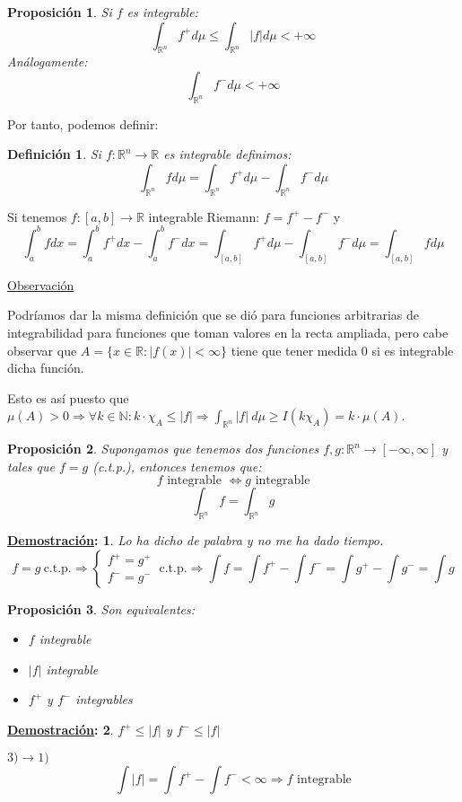 \documentclass[10pt,a4paper,openright]{book}
\theoremstyle{break}
\newtheorem*{defi}{Definición}
\newtheorem*{prop}{Proposición}
\newtheorem*{demo}{\underline{Demostración}:}
\begin{document}
\begin{prop}
Si $f$ es integrable: 
$$\int_{\mathbb{R}^n} f^+ d \mu \le \int_{\mathbb{R}^n} \vert f \vert d \mu < +\infty$$
Análogamente: 
$$\int_{\mathbb{R}^n} f^- d \mu < +\infty$$
\end{prop}

Por tanto, podemos definir: 
\begin{defi}
Si $f: \mathbb{R}^{n} \rightarrow \mathbb{R}$ es integrable definimos: 
$$\int_{\mathbb{R}^n} f d \mu = \int_{\mathbb{R}^n} f^+ d \mu - \int_{\mathbb{R}^n} f^- d \mu $$
\end{defi}
Si tenemos $f: \left[a, b\right] \rightarrow \mathbb{R}$ integrable Riemann: $f = f^+ - f^-$ y 
$$\int_a^b f dx = \int_a^b f^+ dx - \int_a^b f^- dx = \int_{\left[a, b\right]}f^+ d \mu - \int_{\left[a, b\right]} f^- d \mu = \int_{\left[a, b\right]}f d \mu$$


\underline{Observación}

Podríamos dar la misma definición que se dió para funciones arbitrarias de integrabilidad para funciones que toman valores en la recta ampliada, pero cabe observar que $A=\{x\in \mathbb{R}: |f(x)|< \infty\}$ tiene que tener medida 0 si es integrable dicha función.

Esto es así puesto que $\mu(A) > 0 \Rightarrow \forall k \in \mathbb{N}: k\cdot \chi_A \leq |f| \Rightarrow \int_{\mathbb{R}^n} |f| \ d\mu \geq I(k\chi_A) = k \cdot \mu(A)$.

\begin{prop}
Supongamos que tenemos dos funciones $f,g: \mathbb{R}^n \rightarrow [-\infty, \infty]$ y tales que $f=g$ (c.t.p.), entonces tenemos que:
$$f \mbox{ integrable }\Leftrightarrow g \mbox{ integrable}$$
$$\int_{\mathbb{R}^n} f = \int_{\mathbb{R}^n} g $$
\end{prop}
\begin{demo}
Lo ha dicho de palabra y no me ha dado tiempo.
$$f=g \ \mbox{c.t.p.}\Rightarrow \begin{cases}
f^+ = g^+ \\ f^- = g^- 
\end{cases} \ \mbox{c.t.p.}\Rightarrow \int f = \int f^+ - \int f^- = \int g^+ - \int g^- = \int g$$
\end{demo}

\begin{prop}
Son equivalentes:
\begin{itemize}
\item $f$ integrable
\item $|f|$ integrable
\item $f^+$ y $f^-$ integrables
\end{itemize}
\end{prop}
\begin{demo}
\item $f^+ \leq |f|$ y $f^- \leq |f|$
\item $3)\rightarrow 1)$
$$\int |f| = \int f^+ - \int f^- < \infty \Rightarrow f \mbox{ integrable}$$
\end{demo}
\end{document}
